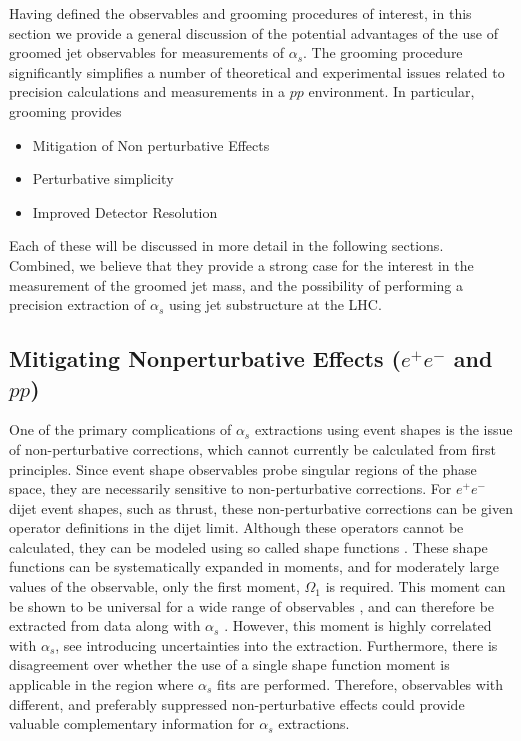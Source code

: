 
Having defined the observables and grooming procedures of interest, in this section we provide a general discussion of the potential advantages of the use of groomed jet observables for measurements of $\alpha_s$. The grooming procedure significantly simplifies a number of theoretical and experimental issues related to precision calculations and measurements in a $pp$ environment. In particular, grooming provides
\begin{itemize}
\item Mitigation of Non perturbative Effects
\item Perturbative simplicity
\item Improved Detector Resolution
\end{itemize}
Each of these will be discussed in more detail in the following sections.  Combined, we believe that they provide a strong case for the interest in the measurement of the groomed jet mass, and the possibility of performing a precision extraction of $\alpha_s$ using jet substructure at the LHC.




\subsection{Mitigating Nonperturbative Effects ($e^+e^-$ and $pp$)}

One of the primary complications of $\alpha_s$ extractions using event shapes is the issue of non-perturbative corrections, which cannot currently be calculated from first principles. Since event shape observables probe singular regions of the phase space, they are necessarily sensitive to non-perturbative corrections.  For $e^+e^-$ dijet event shapes, such as thrust, these non-perturbative corrections can be given operator definitions in the dijet limit. Although these operators cannot be calculated, they can be modeled using so called shape functions \cite{Korchemsky:1999kt,Korchemsky:2000kp,Hoang:2007vb,Ligeti:2008ac}. These shape functions can be systematically expanded in moments, and for moderately large values of the observable, only the first moment, $\Omega_1$ is required. This moment can be shown to be universal for a wide range of observables \cite{Lee:2006fn,Lee:2007jr}, and can therefore be extracted from data along with $\alpha_s$ \cite{Abbate:2010xh,Abbate:2012jh,Hoang:2015hka}. However, this moment is highly correlated with $\alpha_s$, see  introducing  uncertainties into the extraction. Furthermore, there is disagreement over whether the use of a single shape function moment is applicable in the region where $\alpha_s$ fits are performed. Therefore, observables with different, and preferably suppressed  non-perturbative effects could provide valuable complementary information for $\alpha_s$ extractions.

